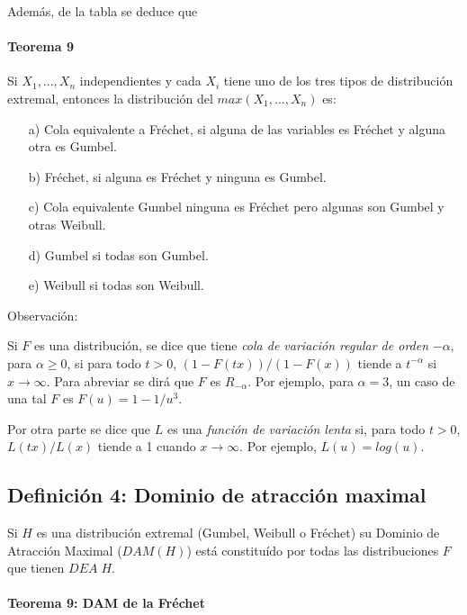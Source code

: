 \documentclass[
  oneside]{book}
\begin{document}
Además, de la tabla se deduce que

\hypertarget{teorema-9}{%
\paragraph{Teorema 9}\label{teorema-9}}

Si \(X_1,...,X_n\) independientes y cada \(X_i\) tiene uno de los tres
tipos de distribución extremal, entonces la distribución del
\(max(X_1,...,X_n)\) es:

\begin{itemize}
\item[a)] Cola equivalente a Fréchet, si alguna de las variables es Fréchet y alguna otra es Gumbel.
\item[b)]  Fréchet, si alguna es Fréchet y ninguna es Gumbel.
\item[c)]  Cola equivalente Gumbel ninguna es Fréchet pero algunas son Gumbel y otras Weibull.
\item[d)] Gumbel si todas son Gumbel.
\item[e)]  Weibull si todas son Weibull.
\end{itemize}

Observación:

Si \(F\) es una distribución, se dice que tiene
\textit{cola de variación regular de orden} \(-\alpha\), para
\(\alpha \geq 0\), si para todo \(t>0\), \((1-F(tx))/(1-F(x))\) tiende a
\(t^{-\alpha}\) si \(x \rightarrow \infty\). Para abreviar se dirá que
\(F\) es \(R_{-\alpha}\). Por ejemplo, para \(\alpha=3\), un caso de una
tal \(F\) es \(F(u)=1- 1/u^3\).

Por otra parte se dice que \(L\) es una
\textit{función de variación lenta} si, para todo \(t>0\),
\(L(tx)/L(x)\) tiende a 1 cuando \(x \rightarrow \infty\). Por ejemplo,
\(L(u)=log(u)\).

\newpage

\hypertarget{definiciuxf3n-4-dominio-de-atracciuxf3n-maximal}{%
\subsection{Definición 4: Dominio de atracción
maximal}\label{definiciuxf3n-4-dominio-de-atracciuxf3n-maximal}}

Si \(H\) es una distribución extremal (Gumbel, Weibull o Fréchet) su
Dominio de Atracción Maximal (\(DAM(H)\)) está constituído por todas las
distribuciones \(F\) que tienen \(DEA\;H\).

\hypertarget{teorema-9-dam-de-la-fruxe9chet}{%
\paragraph{Teorema 9: DAM de la
Fréchet}\label{teorema-9-dam-de-la-fruxe9chet}}
\end{document}
